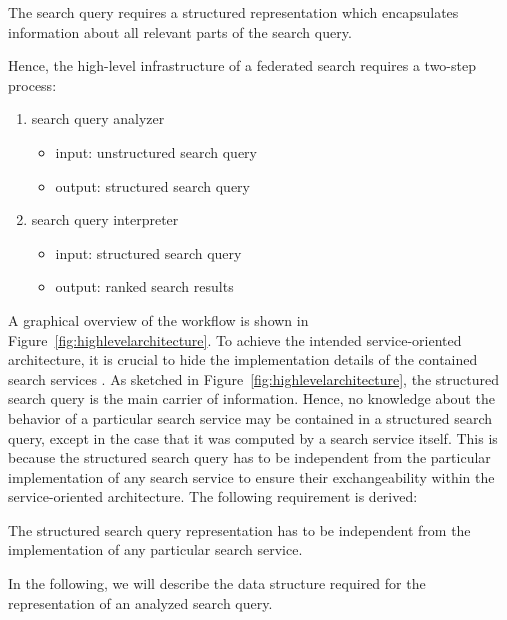 \begin{req}\label{req:allrelevantparts}
The search query requires a structured representation which encapsulates information about all relevant parts of the search query. 
\end{req}

Hence, the high-level infrastructure of a federated search requires a two-step process:
\begin{enumerate}
\item search query analyzer
    \begin{itemize}
    \item input: unstructured search query
    \item output: structured search query
    \end{itemize}
\item search query interpreter
    \begin{itemize}
    \item input: structured search query
    \item output: ranked search results 
    \end{itemize}
\end{enumerate}
A graphical overview of the workflow is shown in Figure~\ref{fig:highlevelarchitecture}. 
To achieve the intended service-oriented architecture, it is crucial to hide the implementation details of the contained search services \cite{erl2008soa}.
As sketched in Figure~\ref{fig:highlevelarchitecture}, the structured search query is the main carrier of information.
Hence, no knowledge about the behavior of a particular search service may be contained in a structured search query, except in the case that it was computed by a search service itself. 
This is because the structured search query has to be independent from the particular implementation of any search service to ensure their exchangeability within the service-oriented architecture.
The following requirement is derived:
\begin{req}\label{req:independence}
The structured search query representation has to be independent from the implementation of any particular search service.
\end{req}

In the following, we will describe the data structure required for the representation of an analyzed search query.


